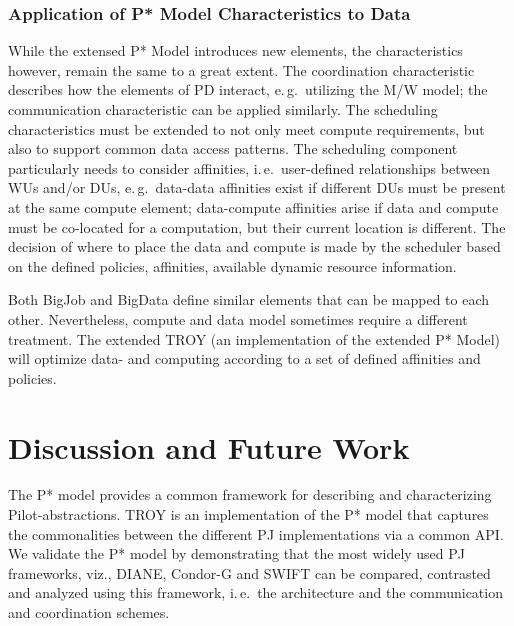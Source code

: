 \documentclass[conference,final]{IEEEtran}
\newcommand{\upp}{\vspace*{-0.5em}}
\begin{document}
\subsubsection*{Application of P* Model Characteristics to Data}

While the extensed P* Model introduces new elements, the
characteristics however, remain the same to a great extent. The
coordination characteristic describes how the elements of PD interact,
e.\,g.\ utilizing the M/W model; the communication characteristic can
be applied similarly. The scheduling characteristics must be extended
to not only meet compute requirements, but also to support common data
access patterns. The scheduling component particularly needs to
consider affinities, i.\,e.\ user-defined relationships between WUs
and/or DUs, e.\,g.\ data-data affinities exist if different DUs must
be present at the same compute element; data-compute affinities arise
if data and compute must be co-located for a computation, but their
current location is different. The decision of where to place the data
and compute is made by the scheduler based on the defined policies,
affinities, available dynamic resource information.



Both BigJob and BigData define similar elements that can be mapped to
each other. Nevertheless, compute and data model sometimes require a
different treatment.  The extended TROY (an implementation of the
extended P* Model) will optimize data- and computing according to a
set of defined affinities and policies.



\section{Discussion and Future Work \upp\upp}


The P* model provides a common framework for describing and
characterizing Pilot-abstractions. TROY is an implementation of the P*
model that captures the commonalities between the different PJ
implementations via a common API.  We validate the P* model by
demonstrating that the most widely used PJ frameworks, viz., DIANE,
Condor-G and SWIFT can be compared, contrasted and analyzed using this
framework, i.\,e.\ the architecture and the communication and
coordination schemes.
\end{document}
